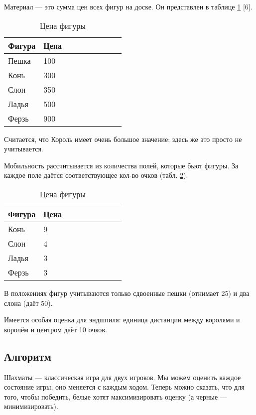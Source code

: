 { 	 Материал --- это сумма цен всех фигур на доске. Он представлен в таблице \ref{tab: material} [6].
 	 
 	 	\begin{table}[h]
 	 	\centering
 	 	\caption{Цена фигуры}
 	 	\label{tab: material}
 	 	\begin{tabular}{|l|l|l|l|l|l|l|l|l|}
 	 		\hline
 	 		Фигура & Цена \\ \hline
 	 		Пешка & 100 \\ \hline
 	 		Конь & 300 \\ \hline
 	 		Слон & 350  \\ \hline
 	 		Ладья & 500 \\ \hline
 	 		Ферзь & 900 \\ \hline
 	 		\end{tabular}
  		\end{table}
 		
	Считается, что Король имеет очень большое значение; здесь же это просто не учитывается.
	
	Мобильность рассчитывается из количества полей, которые бьют фигуры. За каждое поле даётся соответствующее кол-во очков (табл. \ref{tab: mobility}).
	
	\begin{table}[h]
		\centering
		\caption{Цена фигуры}
		\label{tab: mobility}
		\begin{tabular}{|l|l|l|l|l|l|l|l|l|}
			\hline
			Фигура & Цена \\ 
			\hline
			Конь & 9 \\ 
			\hline
			Слон & 4  \\ 
			\hline
			Ладья & 3 \\ 
			\hline
			Ферзь & 3 \\ 
			\hline
		\end{tabular}
	\end{table}

	В положениях фигур учитываются только сдвоенные пешки (отнимает 25) и два слона (даёт 50). 
	
	Имеется особая оценка для эндшпиля: единица дистанции между королями и королём и центром даёт 10 очков.
	
   	\subsection{Алгоритм}
   	
   	Шахматы --- классическая игра для двух игроков. Мы можем оценить каждое состояние игры; оно меняется с каждым ходом. Теперь можно сказать, что для того, чтобы победить, белые хотят максимизировать оценку (а черные --- минимизировать). 
   	
}
